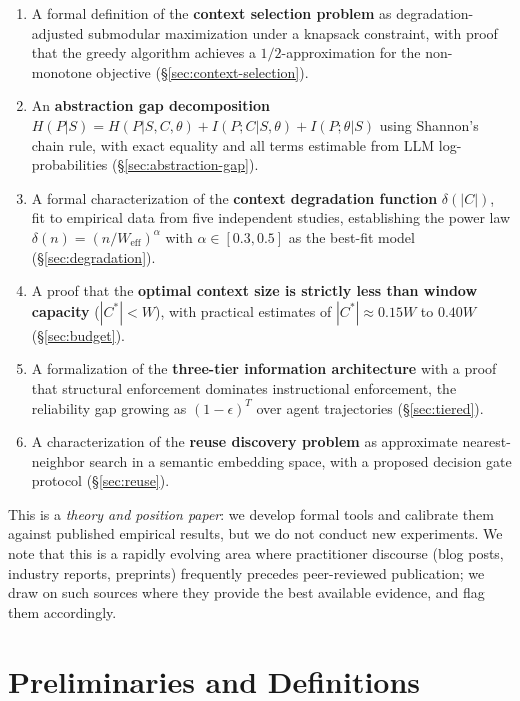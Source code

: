 \documentclass[11pt, a4paper, copyright]{googledeepmind}
\begin{document}
\begin{enumerate}
    \item A formal definition of the \textbf{context selection problem} as degradation-adjusted submodular maximization under a knapsack constraint, with proof that the greedy algorithm achieves a $1/2$-approximation for the non-monotone objective (\S\ref{sec:context-selection}).
    \item An \textbf{abstraction gap decomposition} $H(P|S) = H(P|S,C,\theta) + I(P;C|S,\theta) + I(P;\theta|S)$ using Shannon's chain rule, with exact equality and all terms estimable from LLM log-probabilities (\S\ref{sec:abstraction-gap}).
    \item A formal characterization of the \textbf{context degradation function} $\delta(|C|)$, fit to empirical data from five independent studies, establishing the power law $\delta(n) = (n/W_{\text{eff}})^\alpha$ with $\alpha \in [0.3, 0.5]$ as the best-fit model (\S\ref{sec:degradation}).
    \item A proof that the \textbf{optimal context size is strictly less than window capacity} ($|C^*| < W$), with practical estimates of $|C^*| \approx 0.15W$ to $0.40W$ (\S\ref{sec:budget}).
    \item A formalization of the \textbf{three-tier information architecture} with a proof that structural enforcement dominates instructional enforcement, the reliability gap growing as $(1-\epsilon)^T$ over agent trajectories (\S\ref{sec:tiered}).
    \item A characterization of the \textbf{reuse discovery problem} as approximate nearest-neighbor search in a semantic embedding space, with a proposed decision gate protocol (\S\ref{sec:reuse}).
\end{enumerate}

This is a \emph{theory and position paper}: we develop formal tools and calibrate them against published empirical results, but we do not conduct new experiments. We note that this is a rapidly evolving area where practitioner discourse (blog posts, industry reports, preprints) frequently precedes peer-reviewed publication; we draw on such sources where they provide the best available evidence, and flag them accordingly.


\section{Preliminaries and Definitions}
\label{sec:preliminaries}
\end{document}
